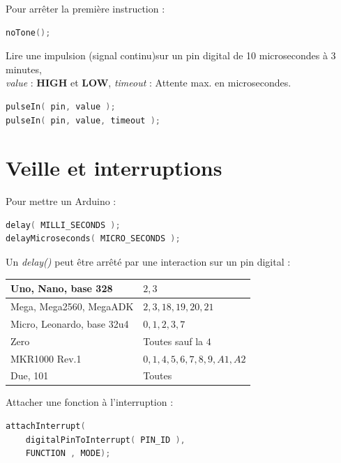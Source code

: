             Pour arrêter la première instruction :
            \begin{lstlisting}[language=C]
noTone();
            \end{lstlisting}


            Lire une impulsion (signal continu)sur un pin digital de 10 microsecondes à 3 minutes,\\
            \textit{value} : \textbf{HIGH} et \textbf{LOW}, \textit{timeout} : Attente max. en microsecondes.
            \begin{lstlisting}[language=C]
pulseIn( pin, value );
pulseIn( pin, value, timeout );
            \end{lstlisting}

    \section{Veille et interruptions}
        Pour mettre un Arduino :
        \begin{lstlisting}[language=C]
delay( MILLI_SECONDS );
delayMicroseconds( MICRO_SECONDS );
        \end{lstlisting}
        Un \textit{delay()} peut être arrêté par une interaction sur un pin digital :

        \begin{center}
            \begin{tabular}{| l | l |}
                \hline
                    Uno, Nano, base 328 & $2, 3$\\
                \hline
                    Mega, Mega2560, MegaADK & $2, 3, 18, 19, 20, 21$\\
                \hline
                    Micro, Leonardo, base 32u4 & $0, 1, 2, 3, 7$\\
                \hline
                    Zero & Toutes sauf la $4$\\
                \hline
                    MKR1000 Rev.1 & $0, 1, 4, 5, 6, 7, 8, 9, A1, A2$\\
                \hline
                    Due, 101 & Toutes\\
                \hline
            \end{tabular}
        \end{center}

        Attacher une fonction à l'interruption :
        \begin{lstlisting}[language=C]
attachInterrupt(
    digitalPinToInterrupt( PIN_ID ),
    FUNCTION , MODE);
        \end{lstlisting}

